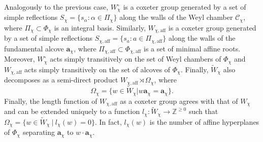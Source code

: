 \documentclass{article}
\newcommand{\aff}{\mathrm{aff}}
\newcommand{\ZZ}{\mathbb{Z}}
\theoremstyle{plain}
\theoremstyle{definition}
\begin{document}
    Analogously to the previous case, $W_\chi^\circ$ is a coxeter group generated by a set of simple reflections $S_\chi=\{s_\alpha:\alpha\in\Pi_\chi\}$ along the walls of the Weyl chamber $\mathcal{C}_\chi$, where $\Pi_\chi\subset\Phi_\chi$ is an integral basis. Similarly, $W_{\chi,\aff}$ is a coxeter group generated by a set of simple reflections $S_{\chi,\aff}=\{s_a:a\in\Pi_{\chi,\aff}\}$ along the walls of the fundamental alcove $\mathbf{a}_\chi$, where $\Pi_{\chi,\aff}\subset\Phi_{\chi,\aff}$ is a set of minimal affine roots. Moreover, $W_\chi^\circ$ acts simply transitively on the set of Weyl chambers of $\Phi_\chi$ and $W_{\chi,\aff}$ acts simply transitively on the set of alcoves of $\Phi_\chi$. Finally, $\tilde{W}_\chi$ also decomposes as a semi-direct product $W_{\chi,\aff}\rtimes\Omega_\chi$, where %
    $$\Omega_\chi=\{w\in\tilde{W}_\chi|w\mathbf{a}_\chi=\mathbf{a}_\chi\}.$$
    Finally, the length function of $W_{\chi,\aff}$ as a coxeter group agrees with that of $W_\chi$ and can be extended uniquely to a function $l_\chi:\tilde{W}_\chi\rightarrow\ZZ^{\geq0}$ such that $\Omega_\chi=\{w\in\tilde{W}_\chi\ |\ l_\chi(w)=0\}$. In fact, $l_\chi(w)$ is the number of affine hyperplanes of $\Phi_\chi$ separating $\mathbf{a}_\chi$ to $w\cdot\mathbf{a}_\chi$.
\end{document}
